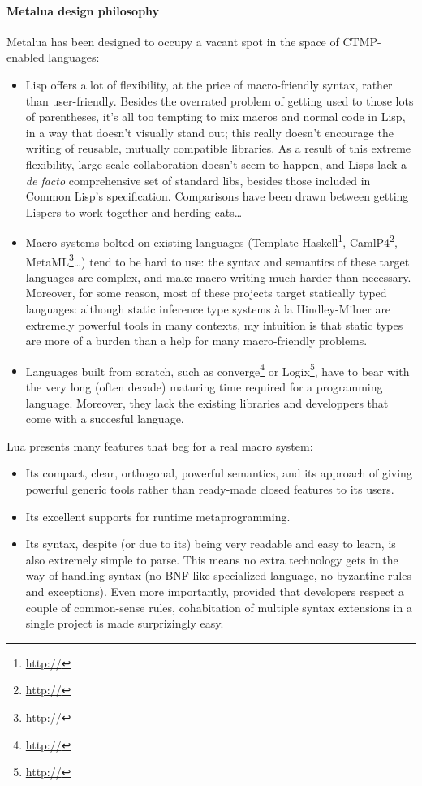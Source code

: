 \paragraph{Metalua design philosophy}
Metalua has been designed to occupy a vacant spot in the space of
CTMP-enabled languages:
\begin{itemize}

\item Lisp offers a lot of flexibility, at the price of macro-friendly
  syntax, rather than user-friendly. Besides the overrated problem of
  getting used to those lots of parentheses, it's all too tempting to
  mix macros and normal code in Lisp, in a way that doesn't visually
  stand out; this really doesn't encourage the writing of reusable,
  mutually compatible libraries. As a result of this extreme
  flexibility, large scale collaboration doesn't seem to happen, and
  Lisps lack a {\em de facto} comprehensive set of standard libs,
  besides those included in Common Lisp's specification. Comparisons
  have been drawn between getting Lispers to work together and herding
  cats\ldots

\item Macro-systems bolted on existing languages (Template
  Haskell\footnote{\url{http://}}, CamlP4\footnote{\url{http://}},
  MetaML\footnote{\url{http://}}\ldots) tend to be hard to use: the
  syntax and semantics of these target languages are complex, and make
  macro writing much harder than necessary. Moreover, for some reason,
  most of these projects target statically typed languages: although
  static inference type systems {\`a la} Hindley-Milner are extremely
  powerful tools in many contexts, my intuition is that static types
  are more of a burden than a help for many macro-friendly problems.

\item Languages built from scratch, such as
  converge\footnote{\url{http://}} or Logix\footnote{\url{http://}},
  have to bear with the very long (often decade) maturing time
  required for a programming language. Moreover, they lack the
  existing libraries and developpers that come with a succesful
  language.

\end{itemize}

\noindent Lua presents many features that beg for a real macro system:

\begin{itemize}
\item Its compact, clear, orthogonal, powerful semantics, and its
  approach of giving powerful generic tools rather than ready-made
  closed features to its users.
\item Its excellent supports for runtime metaprogramming.
\item Its syntax, despite (or due to its) being very readable and easy
  to learn, is also extremely simple to parse. This means no extra
  technology gets in the way of handling syntax (no BNF-like
  specialized language, no byzantine rules and exceptions). Even more
  importantly, provided that developers respect a couple of
  common-sense rules, cohabitation of multiple syntax extensions in a
  single project is made surprizingly easy.
\end{itemize}

